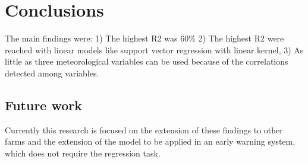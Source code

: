 \section{Conclusions}
\label{sec:concl}

The main findings were: 1) The highest R2 was 60\% 2) The highest R2 were reached with linear models like support vector regression with linear kernel, 3) As little as three meteorological variables can be used because of the correlations detected among variables. 

\subsection{Future work}
Currently this research is focused on the extension of these findings to other farms and the extension of the model to be applied in an early warning system, which does not require the regression task.
